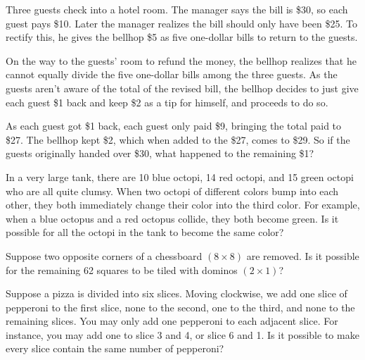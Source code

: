 \documentclass[12pt]{article}
\begin{document}
        \begin{exercise}
            Three guests check into a hotel room. The manager says the bill is \$30, so each guest pays \$10. Later the manager realizes the bill should only have been \$25. To rectify this, he gives the bellhop \$5 as five one-dollar bills to return to the guests.

            On the way to the guests' room to refund the money, the bellhop realizes that he cannot equally divide the five one-dollar bills among the three guests. As the guests aren't aware of the total of the revised bill, the bellhop decides to just give each guest \$1 back and keep \$2 as a tip for himself, and proceeds to do so.

            As each guest got \$1 back, each guest only paid \$9, bringing the total paid to \$27. The bellhop kept \$2, which when added to the \$27, comes to \$29. So if the guests originally handed over \$30, what happened to the remaining \$1?
        \end{exercise}

        \begin{exercise}
            In a very large tank, there are 10 blue octopi, 14 red octopi, and 15 green octopi who are all quite clumsy.
            When two octopi of different colors bump into each other, they both immediately change their color into the third color.
            For example, when a blue octopus and a red octopus collide, they both become green.
            Is it possible for all the octopi in the tank to become the same color?
        \end{exercise}

        \begin{exercise}
            Suppose two opposite corners of a chessboard \((8\times 8)\) are removed. Is it possible for the remaining 62 squares to be tiled with dominos \((2\times 1)\)?
        \end{exercise}

        \begin{exercise}
            Suppose a pizza is divided into six slices. Moving clockwise, we add one slice of pepperoni to the first slice, none to the second, one to the third, and none to the remaining slices. You may only add one pepperoni to each adjacent slice. For instance, you may add one to slice 3 and 4, or slice 6 and 1. Is it possible to make every slice contain the same number of pepperoni?
        \end{exercise}
    
\end{document}
